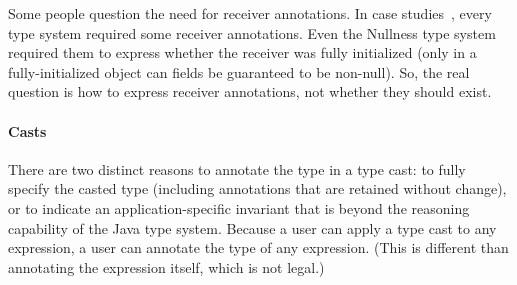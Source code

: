 \documentclass[10pt]{article}
\begin{document}
Some people question the need for receiver annotations.  In
case studies~\cite{PapiACPE2008}, every type system required some
receiver annotations.  Even the Nullness type system required them to
express whether the receiver was fully initialized (only in a
fully-initialized object can fields be guaranteed to be non-null).
So, the real question is how to express receiver annotations, not
whether they should exist.


\paragraph{Casts}
There are two distinct reasons to annotate the type in a type cast:  to
fully specify the casted type (including annotations that are retained
without change), or to indicate
an application-specific invariant that is beyond the reasoning capability
of the Java type system.
Because a user can apply a type cast to any expression, a user can
annotate the type of any expression.  (This is different than annotating
the expression itself, which is not legal.)
\end{document}
